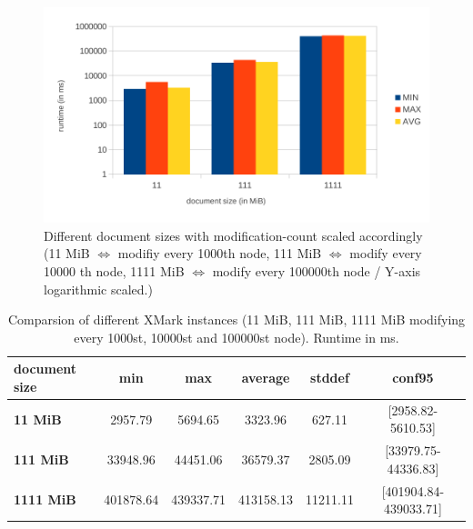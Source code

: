 \begin{figure}[tb]
\centering
\includegraphics[width=\textwidth]{figures/diff-docsize-scale}
\caption{Different document sizes with modification-count scaled accordingly (11 MiB $\Leftrightarrow$ modifiy every 1000th node, 111 MiB $\Leftrightarrow$ modify every 10000 th node, 1111 MiB $\Leftrightarrow$ modify every 100000th node / Y-axis logarithmic scaled.)} 
\label{fig:docScaling}
\end{figure}

\begin{table}[tb]
\centering 
\begin{tabular}[r]{|l|c|c|c|c|c|} 
\hline
\textbf{document size} & \textbf{min} & \textbf{max} & \textbf{average} & \textbf{stddef} & \textbf{conf95}\\
\hline
\hline
\textbf{11 MiB} & 2957.79 & 5694.65 & 3323.96 & 627.11 & [2958.82-5610.53]\\
\hline
\textbf{111 MiB} & 33948.96 & 44451.06 & 36579.37 & 2805.09 & [33979.75-44336.83]\\
\hline
\textbf{1111 MiB} & 401878.64 & 439337.71 & 413158.13 & 11211.11 & [401904.84-439033.71]\\
\hline
\end{tabular}
\label{chap3:compDiffInstances}
\vspace{0.5em} 
\caption{Comparsion of different XMark instances (11 MiB, 111 MiB, 1111 MiB modifying every 1000st, 10000st and 100000st node). Runtime in ms.}
\end{table}


